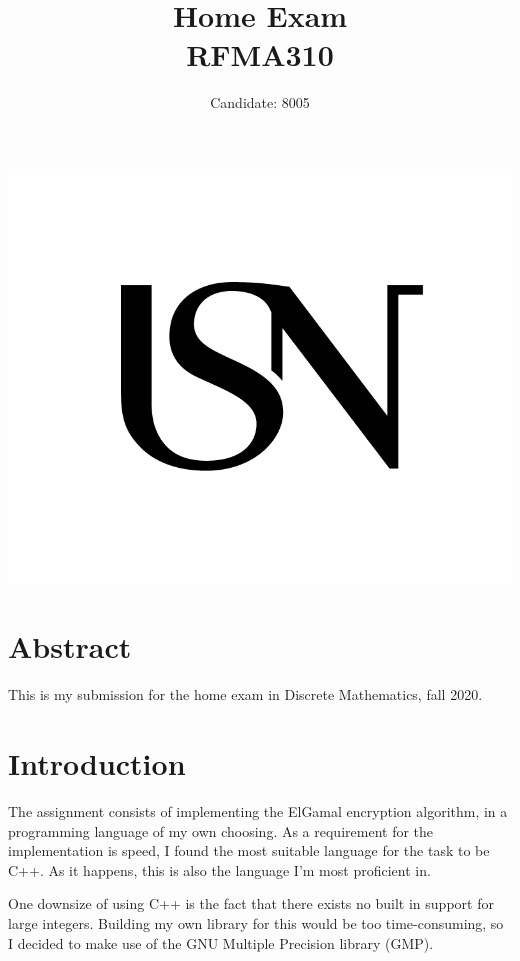 \documentclass{article}
\begin{document}
\author{Candidate: 8005}
\title{Home Exam\\RFMA310}

\maketitle
\thispagestyle{empty}
\begin{center}
\includegraphics[width=\linewidth,height=0.2\textheight,keepaspectratio]{img/USN.png}
\end{center}
\newpage

\tableofcontents

\newpage

\section{Abstract}
This is my submission for the home exam in Discrete Mathematics, fall 2020.

\section{Introduction}
The assignment consists of implementing the ElGamal encryption algorithm, in a programming language of my own choosing. As a requirement for the implementation is speed, I found the most suitable language for the task to be C++. As it happens, this is also the language I'm most proficient in.

One downsize of using C++ is the fact that there exists no built in support for large integers. Building my own library for this would be too time-consuming, so I decided to make use of the GNU Multiple Precision library (GMP)\cite{GMP}.
\end{document}

